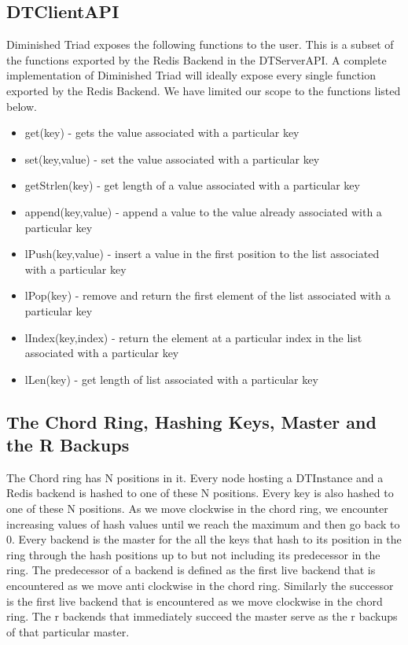 \documentclass[10pt,twocolumn,letterpaper]{article}
\begin{document}
\subsection{DTClientAPI}
Diminished Triad exposes the following functions to the user. This is a subset of the functions exported by the Redis Backend in the DTServerAPI. A complete implementation of Diminished Triad will ideally expose every single function exported by the Redis Backend. We have limited our scope to the functions listed below.
\begin{itemize}
  \item get(key) - gets the value associated with a particular key
  \item set(key,value) - set the value associated with a particular key
  \item getStrlen(key) - get length of a value associated with a particular key
  \item append(key,value) - append a value to the value already associated with a particular key
  \item lPush(key,value) - insert a value in the first position to the list associated with a particular key
  \item lPop(key) - remove and return the first element of the list associated with a particular key
  \item lIndex(key,index) - return the element at a particular index in the list associated with a particular key
  \item lLen(key) - get length of list associated with a particular key
\end{itemize}

\subsection{The Chord Ring, Hashing Keys, Master and the R Backups}
The Chord ring has N positions in it. Every node hosting a DTInstance and a Redis backend is hashed to one of these N positions. Every key is also hashed to one of these N positions. As we move clockwise in the chord ring, we encounter increasing values of hash values until we reach the maximum and then go back to 0. Every backend is the master for the all the keys that hash to its position in the ring through the hash positions up to but not including its  predecessor in the ring. The predecessor of a backend is defined as the first live backend that is encountered as we move anti clockwise in the chord ring. Similarly the successor is the first live backend that is encountered as we move clockwise in the chord ring. The r backends that immediately succeed the master serve as the r backups of that particular master. 
\end{document}
